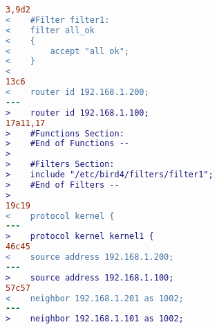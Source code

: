 \begin{lstlisting}[language=diff,caption={Differences in Bird configuration using v0.2 and v0.3 of the Package.}]
3,9d2
<    #Filter filter1:
<    filter all_ok
<    {
<        accept "all ok";
<    }
<
13c6
<    router id 192.168.1.200;
---
>    router id 192.168.1.100;
17a11,17
>    #Functions Section:
>    #End of Functions --
>  
>    #Filters Section:
>    include "/etc/bird4/filters/filter1";
>    #End of Filters --
>  
19c19
<    protocol kernel {
---
>    protocol kernel kernel1 {
46c45
<    source address 192.168.1.200;
---
>    source address 192.168.1.100;
57c57
<    neighbor 192.168.1.201 as 1002;
---
>    neighbor 192.168.1.101 as 1002;
\end{lstlisting}
